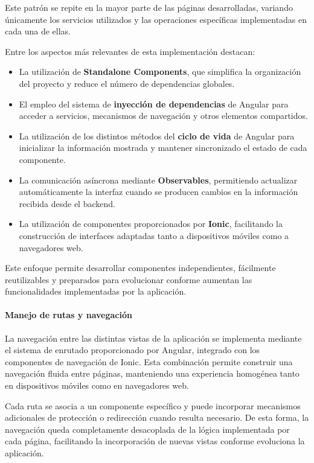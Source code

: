 Este patrón se repite en la mayor parte de las páginas desarrolladas, variando únicamente los servicios utilizados y las operaciones específicas implementadas en cada una de ellas.

Entre los aspectos más relevantes de esta implementación destacan:

\begin{itemize}
    \item La utilización de \textbf{Standalone Components}, que simplifica la organización del proyecto y reduce el número de dependencias globales.

    \item El empleo del sistema de \textbf{inyección de dependencias} de Angular para acceder a servicios, mecanismos de navegación y otros elementos compartidos.

    \item La utilización de los distintos métodos del \textbf{ciclo de vida} de Angular para inicializar la información mostrada y mantener sincronizado el estado de cada componente.

    \item La comunicación asíncrona mediante \textbf{Observables}, permitiendo actualizar automáticamente la interfaz cuando se producen cambios en la información recibida desde el backend.

    \item La utilización de componentes proporcionados por \textbf{Ionic}, facilitando la construcción de interfaces adaptadas tanto a dispositivos móviles como a navegadores web.
\end{itemize}

Este enfoque permite desarrollar componentes independientes, fácilmente reutilizables y preparados para evolucionar conforme aumentan las funcionalidades implementadas por la aplicación.

\paragraph{Manejo de rutas y navegación}

La navegación entre las distintas vistas de la aplicación se implementa mediante el sistema de enrutado proporcionado por Angular, integrado con los componentes de navegación de Ionic. Esta combinación permite construir una navegación fluida entre páginas, manteniendo una experiencia homogénea tanto en dispositivos móviles como en navegadores web.

Cada ruta se asocia a un componente específico y puede incorporar mecanismos adicionales de protección o redirección cuando resulta necesario. De esta forma, la navegación queda completamente desacoplada de la lógica implementada por cada página, facilitando la incorporación de nuevas vistas conforme evoluciona la aplicación.

